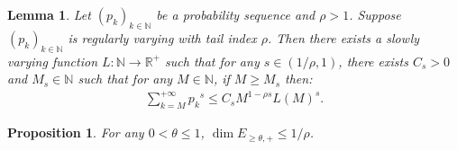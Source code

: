 \documentclass[10pt,a4paper]{amsart}
\newtheorem{lemma}{Lemma}
\newtheorem{prop}{Proposition}
\begin{document}
\begin{lemma}\label{lem:tailpk}
Let $(p_k)_{k\in\mathbb{N}}$ be a probability sequence and $\rho>1$.
Suppose $(p_k)_{k\in\mathbb{N}}$ is regularly varying with tail index $\rho$.
Then there exists a slowly varying function $L:\mathbb{N}\to\mathbb{R}^+$ such that for any $s\in(1/\rho,1)$, there exists $C_s>0$ and $M_{s}\in\mathbb{N}$ such that for any $M\in\mathbb{N}$, if $M\geq M_s$ then:
\begin{align*}
    \sum_{k=M}^{+\infty} {p_k}^{s} \leq C_s M^{1-\rho s}L(M)^{s}.
\end{align*}
\end{lemma}

\begin{prop}\label{prop: thm 1 prop 4}
    For any $0<\theta\leq 1$, $\dim{E_{\geq\theta,+}}\leq 1/\rho$.
\end{prop}
\end{document}
